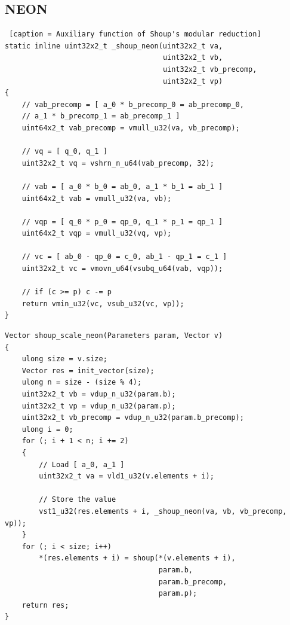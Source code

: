 \documentclass{article}
\begin{document}
\subsection{NEON}
\begin{lstlisting} [caption = Auxiliary function of Shoup's modular reduction]
static inline uint32x2_t _shoup_neon(uint32x2_t va,
                                     uint32x2_t vb,
                                     uint32x2_t vb_precomp,
                                     uint32x2_t vp)
{
    // vab_precomp = [ a_0 * b_precomp_0 = ab_precomp_0,
    // a_1 * b_precomp_1 = ab_precomp_1 ]
    uint64x2_t vab_precomp = vmull_u32(va, vb_precomp);

    // vq = [ q_0, q_1 ]
    uint32x2_t vq = vshrn_n_u64(vab_precomp, 32);

    // vab = [ a_0 * b_0 = ab_0, a_1 * b_1 = ab_1 ]
    uint64x2_t vab = vmull_u32(va, vb);

    // vqp = [ q_0 * p_0 = qp_0, q_1 * p_1 = qp_1 ]
    uint64x2_t vqp = vmull_u32(vq, vp);

    // vc = [ ab_0 - qp_0 = c_0, ab_1 - qp_1 = c_1 ]
    uint32x2_t vc = vmovn_u64(vsubq_u64(vab, vqp));

    // if (c >= p) c -= p
    return vmin_u32(vc, vsub_u32(vc, vp));
}
\end{lstlisting}
\begin{lstlisting}[caption = NEON Implementation of Shoup's modular reduction]
Vector shoup_scale_neon(Parameters param, Vector v)
{
    ulong size = v.size;
    Vector res = init_vector(size);
    ulong n = size - (size % 4);
    uint32x2_t vb = vdup_n_u32(param.b);
    uint32x2_t vp = vdup_n_u32(param.p);
    uint32x2_t vb_precomp = vdup_n_u32(param.b_precomp);
    ulong i = 0;
    for (; i + 1 < n; i += 2)
    {
        // Load [ a_0, a_1 ]
        uint32x2_t va = vld1_u32(v.elements + i);

        // Store the value
        vst1_u32(res.elements + i, _shoup_neon(va, vb, vb_precomp, vp));
    }
    for (; i < size; i++)
        *(res.elements + i) = shoup(*(v.elements + i),
                                    param.b,
                                    param.b_precomp,
                                    param.p);
    return res;
}
\end{lstlisting}
\end{document}
